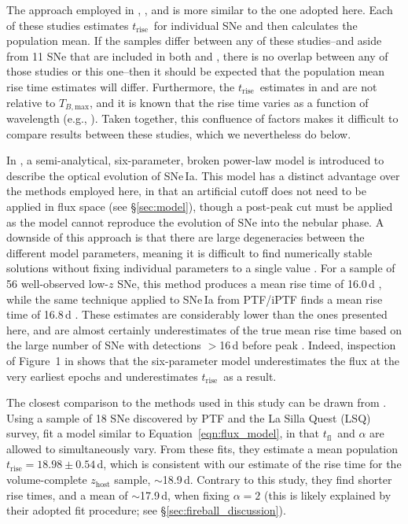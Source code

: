 \documentclass[twocolumn]{./aastex63}
\newcommand{\tfl}{$t_\mathrm{fl}$}
\newcommand{\trise}{$t_\mathrm{rise}$}
\newcommand{\tbmax}{$T_{B,\mathrm{max}}$}
\begin{document}
The approach employed in \citet{Firth15}, \citet{Zheng17a}, and
\citet{Papadogiannakis19} is more similar to the one adopted here. Each of
these studies estimates \trise\ for individual SNe and then calculates the
population mean. If the samples differ between any of these studies--and aside
from 11 SNe that are included in both \citet{Papadogiannakis19} and
\citet{Firth15}, there is no overlap between any of those studies or this
one--then it should be expected that the population mean rise time estimates
will differ. Furthermore, the \trise\ estimates in \citet{Papadogiannakis19}
and \citet{Firth15} are not relative to \tbmax, and it is known that the rise
time varies as a function of wavelength (e.g., \citealt{Ganeshalingam11}).
Taken together, this confluence of factors makes it difficult to compare
results between these studies, which we nevertheless do below.

In \citet{Zheng17}, a semi-analytical, six-parameter, broken power-law model
is introduced to describe the optical evolution of SNe\,Ia. This model has a
distinct advantage over the methods employed here, in that an artificial cutoff
does not need to be applied in flux space (see \S\ref{sec:model}), though a
post-peak cut must be applied as the model cannot reproduce the evolution of
SNe into the nebular phase. A downside of this approach is that there are
large degeneracies between the different model parameters, meaning it is
difficult to find numerically stable solutions without fixing individual
parameters to a single value \citep{Zheng17a}. For a sample of 56
well-observed low-$z$ SNe, this method produces a mean rise time of 16.0\,d
\citep{Zheng17a}, while the same technique applied to SNe\,Ia from PTF/iPTF
finds a mean rise time of 16.8\,d \citep{Papadogiannakis19}. These estimates
are considerably lower than the ones presented here, and are almost certainly
underestimates of the true mean rise time based on the large number of SNe
with detections $>$16\,d before peak \citep{Papadogiannakis19, Yao19}. Indeed,
inspection of Figure~1 in \citet{Zheng17a} shows that the six-parameter model
underestimates the flux at the very earliest epochs and underestimates \trise\
as a result.

The closest comparison to the methods used in this study can be drawn from
\citet{Firth15}. Using a sample of 18 SNe discovered by PTF and the La Silla
Quest (LSQ) survey, \citeauthor{Firth15} fit a model similar to
Equation~\ref{eqn:flux_model}, in that \tfl\ and $\alpha$ are allowed to
simultaneously vary. From these fits, they estimate a mean population \trise$
= 18.98 \pm 0.54$\,d, which is consistent with our estimate of the rise time
for the volume-complete $z_\mathrm{host}$ sample, $\sim$18.9\,d. Contrary to
this study, they find shorter rise times, and a mean of $\sim$17.9\,d, when
fixing $\alpha = 2$ (this is likely explained by their adopted fit procedure;
see \S\ref{sec:fireball_discussion}).
\end{document}
